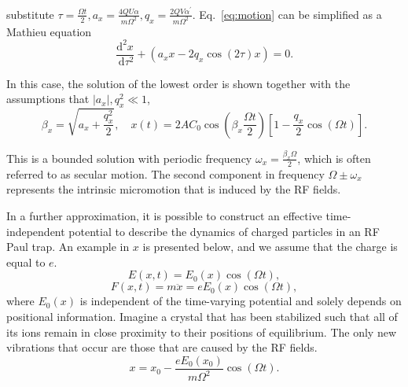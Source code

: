 substitute $\tau=\frac{\Omega t}{2}, a_x=\frac{4 Q U \alpha}{m \Omega^2}, q_x=\frac{2 Q V \alpha^{\prime}}{m \Omega^2}$. Eq.~\eqref{eq:motion} can be simplified as a Mathieu equation
\begin{equation}
    \frac{\mathrm{d}^2 x}{\mathrm{~d} \tau^2}+\left(a_x x-2 q_x \cos (2 \tau) x\right)=0.
\end{equation}

In this case, the solution of the lowest order is shown together with the assumptions that $\left|a_x\right|, q_x^2 \ll 1$,
\begin{equation}
    \beta_x=\sqrt{a_x+\frac{q_x^2}{2}}, \quad x(t)=2 A C_0 \cos \left(\beta_x \frac{\Omega t}{2}\right)\left[1-\frac{q_x}{2} \cos (\Omega t)\right].
\end{equation}

This is a bounded solution with periodic frequency $\omega_x=\frac{\beta_x \Omega}{2}$, which is often referred to as secular motion. The second component in frequency $\Omega \pm \omega_x$ represents the intrinsic micromotion that is induced by the RF fields.

In a further approximation, it is possible to construct an effective time-independent potential to describe the dynamics of charged particles in an RF Paul trap. An example in $x$ is presented below, and we assume that the charge is equal to $e$.
\begin{equation}
    E(x, t)=E_0(x) \cos (\Omega t),
\end{equation}
\begin{equation}
    F(x, t)=m \ddot{x}=e E_0(x) \cos (\Omega t),
\end{equation}
where $E_0(x)$ is independent of the time-varying potential and solely depends on positional information. Imagine a crystal that has been stabilized such that all of its ions remain in close proximity to their positions of equilibrium. The only new vibrations that occur are those that are caused by the RF fields.
\begin{equation}\label{eq:staticmotion}
    x=x_0-\frac{eE_0(x_0)}{m\Omega^2}\cos(\Omega t).
\end{equation}

